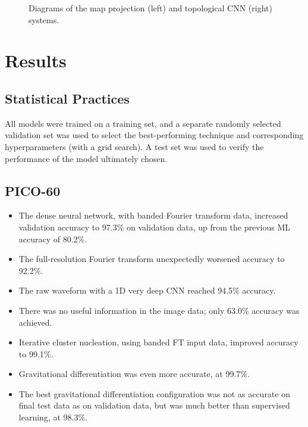 \documentclass[12pt]{article}
\begin{document}
\begin{figure}[ht]
    \centering
    \qquad
    \caption{Diagrams of the map projection (left) and topological CNN (right) systems.}
\end{figure}

\section{Results}

\subsection{Statistical Practices}

All models were trained on a training set, and a separate randomly selected validation set was used to select the best-performing technique and corresponding hyperparameters (with a grid search). A test set was used to verify the performance of the model ultimately chosen.

\subsection{PICO-60}

\begin{itemize}
    \item The dense neural network, with banded Fourier transform data, increased validation accuracy to 97.3\% on validation data, up from the previous ML accuracy of 80.2\%.
    \item The full-resolution Fourier transform unexpectedly worsened accuracy to 92.2\%.
    \item The raw waveform with a 1D very deep CNN reached 94.5\% accuracy.
    \item There was no useful information in the image data; only 63.0\% accuracy was achieved.
    \item Iterative cluster nucleation, using banded FT input data, improved accuracy to 99.1\%.
    \item Gravitational differentiation was even more accurate, at 99.7\%.
    \item The best gravitational differentiation configuration was not as accurate on final test data as on validation data, but was much better than supervised learning, at 98.3\%.
\end{itemize}
\end{document}
